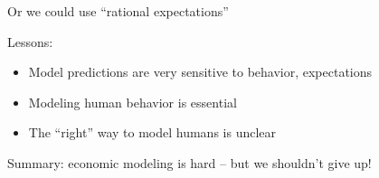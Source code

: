 \documentclass[
    xcolor={svgnames,dvipsnames},
    hyperref={colorlinks, citecolor=DeepPink4, linkcolor=DarkRed, urlcolor=DarkBlue}
    ]{beamer}  %
\newcommand{\1}{\mathbbm 1}
\begin{document}
\begin{frame}

    Or we could use ``rational expectations''
    
    \begin{figure}
        \centering
    \end{figure}

\end{frame}


\begin{frame}

    Lessons:
    \begin{itemize}
        \item Model predictions are very sensitive to behavior, expectations
            \vspace{1em}
        \item Modeling human behavior is essential
            \vspace{1em}
        \item The ``right'' way to model humans is unclear
    \end{itemize}
    
        \vspace{1em}
        \vspace{1em}
    Summary: economic modeling is hard -- but we shouldn't give up!

\end{frame}
\end{document}
